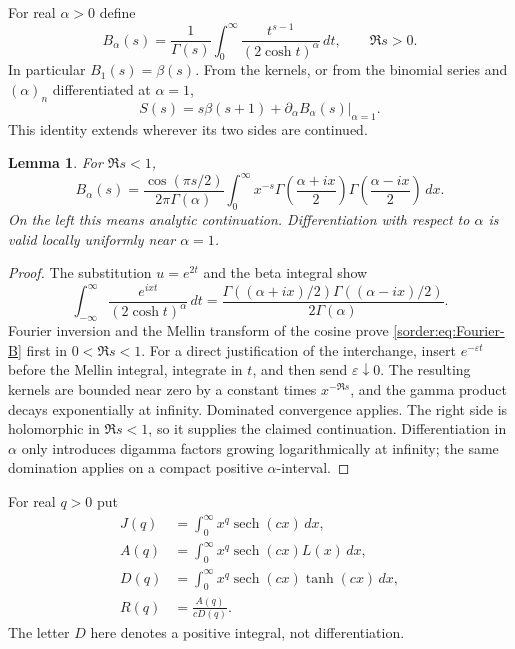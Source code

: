 \documentclass[11pt,a4paper]{article}
\newtheorem{lemma}[theorem]{Lemma}
\theoremstyle{definition}
\theoremstyle{remark}
\newcommand{\sech}{\operatorname{sech}}
\numberwithin{equation}{section}
\begin{document}
For real $\alpha>0$ define
\[
 B_\alpha(s)=\frac1{\Gamma(s)}\int_0^\infty
        \frac{t^{s-1}}{(2\cosh t)^\alpha}\,dt,
 \qquad\Re s>0.
\]
In particular $B_1(s)=\beta(s)$. From the kernels, or from the
binomial series and $(\alpha)_n$ differentiated at $\alpha=1$,
\begin{equation}\label{sorder:eq:parameter-derivative}
 S(s)=s\beta(s+1)+\left.\partial_\alpha B_\alpha(s)\right|_{\alpha=1}.
\end{equation}
This identity extends wherever its two sides are continued.

\begin{lemma}\label{sorder:lem:Fourier}
For $\Re s<1$,
\begin{equation}\label{sorder:eq:Fourier-B}
 B_\alpha(s)=\frac{\cos(\pi s/2)}{2\pi\Gamma(\alpha)}
 \int_0^\infty x^{-s}
 \Gamma\left(\frac{\alpha+ix}{2}\right)
 \Gamma\left(\frac{\alpha-ix}{2}\right)\,dx.
\end{equation}
On the left this means analytic continuation. Differentiation with
respect to $\alpha$ is valid locally uniformly near $\alpha=1$.
\end{lemma}
\begin{proof}
The substitution $u=e^{2t}$ and the beta integral show
\[
 \int_{-\infty}^\infty\frac{e^{ixt}}{(2\cosh t)^\alpha}\,dt
 =\frac{\Gamma((\alpha+ix)/2)\Gamma((\alpha-ix)/2)}{2\Gamma(\alpha)}.
\]
Fourier inversion and the Mellin transform of the cosine prove
\eqref{sorder:eq:Fourier-B} first in $0<\Re s<1$. For a direct
justification of the interchange, insert $e^{-\varepsilon t}$ before
the Mellin integral, integrate in $t$, and then send
$\varepsilon\downarrow0$. The resulting kernels are bounded near
zero by a constant times $x^{-\Re s}$, and the gamma product decays
exponentially at infinity. Dominated convergence applies.
The right side is holomorphic in $\Re s<1$, so it supplies the
claimed continuation. Differentiation in $\alpha$ only introduces
digamma factors growing logarithmically at infinity; the same
domination applies on a compact positive $\alpha$-interval.
\end{proof}

For real $q>0$ put
\begin{align}
 J(q)&=\int_0^\infty x^q\sech(cx)\,dx,
 \label{sorder:def:J}\\
 A(q)&=\int_0^\infty x^q\sech(cx)L(x)\,dx,
 \label{sorder:def:A}\\
 D(q)&=\int_0^\infty x^q\sech(cx)\tanh(cx)\,dx,
 \label{sorder:def:D}\\
 R(q)&=\frac{A(q)}{cD(q)}.
 \label{sorder:def:R}
\end{align}
The letter $D$ here denotes a positive integral, not differentiation.
\end{document}
